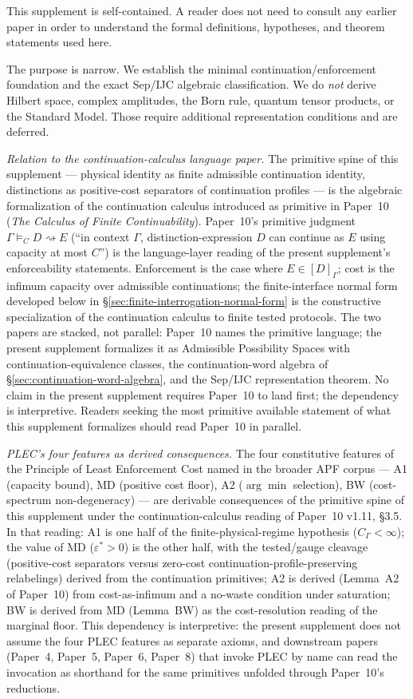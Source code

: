 \documentclass[11pt]{article}
\begin{document}
This supplement is self-contained. A reader does not need to consult any earlier paper in order to understand the formal definitions, hypotheses, and theorem statements used here.

The purpose is narrow. We establish the minimal continuation/enforcement foundation and the exact Sep/IJC algebraic classification. We do \emph{not} derive Hilbert space, complex amplitudes, the Born rule, quantum tensor products, or the Standard Model. Those require additional representation conditions and are deferred.

\medskip
\noindent\textit{Relation to the continuation-calculus language paper.}\quad
The primitive spine of this supplement --- physical identity as finite admissible continuation identity, distinctions as positive-cost separators of continuation profiles --- is the algebraic formalization of the continuation calculus introduced as primitive in Paper~10 (\emph{The Calculus of Finite Continuability}).  Paper~10's primitive judgment $\Gamma\vDash_C D\rightsquigarrow E$ (``in context $\Gamma$, distinction-expression $D$ can continue as $E$ using capacity at most $C$'') is the language-layer reading of the present supplement's enforceability statements.  Enforcement is the case where $E\in[D]_\Gamma$; cost is the infimum capacity over admissible continuations; the finite-interface normal form developed below in \S\ref{sec:finite-interrogation-normal-form} is the constructive specialization of the continuation calculus to finite tested protocols.  The two papers are stacked, not parallel: Paper~10 names the primitive language; the present supplement formalizes it as Admissible Possibility Spaces with continuation-equivalence classes, the continuation-word algebra of \S\ref{sec:continuation-word-algebra}, and the Sep/IJC representation theorem.  No claim in the present supplement requires Paper~10 to land first; the dependency is interpretive.  Readers seeking the most primitive available statement of what this supplement formalizes should read Paper~10 in parallel.

\medskip
\noindent\textit{PLEC's four features as derived consequences.}\quad
The four constitutive features of the Principle of Least Enforcement Cost named in the broader APF corpus --- A1 (capacity bound), MD (positive cost floor), A2 ($\arg\min$ selection), BW (cost-spectrum non-degeneracy) --- are derivable consequences of the primitive spine of this supplement under the continuation-calculus reading of Paper~10 v1.11, \S3.5.  In that reading: A1 is one half of the finite-physical-regime hypothesis ($C_\Gamma < \infty$); the value of MD ($\varepsilon^* > 0$) is the other half, with the tested/gauge cleavage (positive-cost separators versus zero-cost continuation-profile-preserving relabelings) derived from the continuation primitives; A2 is derived (Lemma~A2 of Paper~10) from cost-as-infimum and a no-waste condition under saturation; BW is derived from MD (Lemma~BW) as the cost-resolution reading of the marginal floor.  This dependency is interpretive: the present supplement does not assume the four PLEC features as separate axioms, and downstream papers (Paper~4, Paper~5, Paper~6, Paper~8) that invoke PLEC by name can read the invocation as shorthand for the same primitives unfolded through Paper~10's reductions.
\end{document}
